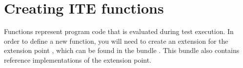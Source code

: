 \chapter{Creating ITE functions}
\label{functions}

Functions represent program code that is evaluated during test execution.
In order to define a new  function, you will need to create an extension
for the extension point , which
can be found in the bundle . This
bundle also contains reference implementations of the extension point.
